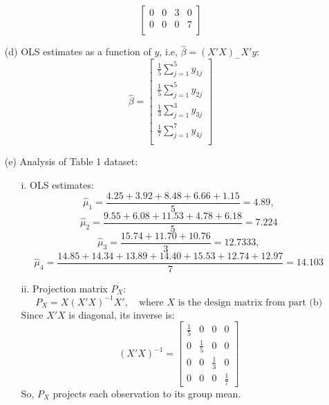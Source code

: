 \documentclass[10pt, oneside]{article}
\begin{document}
\begin{itemize}
\[\begin{bmatrix}
			      0 & 0 & 3 & 0 \\
			      0 & 0 & 0 & 7 \\
		      \end{bmatrix}
	      \]
	\item[(d)] OLS estimates as a function of $y$, i.e, $\hat{\beta}=(X'X)_-X'y$:
	      \[
		      \hat{\beta} = \begin{bmatrix}
			      \frac{1}{5} \sum_{j=1}^{5} y_{1j} \\
			      \frac{1}{5} \sum_{j=1}^{5} y_{2j} \\
			      \frac{1}{3} \sum_{j=1}^{3} y_{3j} \\
			      \frac{1}{7} \sum_{j=1}^{7} y_{4j} \\
		      \end{bmatrix}
	      \]
	\item[(e)] Analysis of Table 1 dataset:
	      \begin{itemize}
		      \item[i.] OLS estimates:
		            \[
			            \hat{\mu}_1 = \frac{4.25 + 3.92 + 8.48 + 6.66 + 1.15}{5} = 4.89,
		            \]
		            \[
			            \hat{\mu}_2 = \frac{9.55 + 6.08 + 11.53 + 4.78 + 6.18}{5} = 7.224
		            \]
		            \[
			            \hat{\mu}_3 = \frac{15.74 + 11.70 + 10.76}{3} = 12.7333,
		            \]
		            \[
			            \hat{\mu}_4 = \frac{14.85 + 14.34 + 13.89 + 14.40 + 15.53 + 12.74 + 12.97}{7} = 14.103
		            \]
		      \item[ii.] Projection matrix $P_X$:
		            \[
			            P_X = X(X'X)^{-1}X', \quad \text{where } X \text{ is the design matrix from part (b)}
		            \]
		            Since \(X'X\) is diagonal, its inverse is:
		            \[
			            (X'X)^{-1} = \begin{bmatrix}
				            \frac{1}{5} & 0           & 0           & 0           \\
				            0           & \frac{1}{5} & 0           & 0           \\
				            0           & 0           & \frac{1}{3} & 0           \\
				            0           & 0           & 0           & \frac{1}{7}
			            \end{bmatrix}
		            \]
		            So, \(P_X\) projects each observation to its group mean.


\end{itemize}
\end{itemize}
\end{document}
